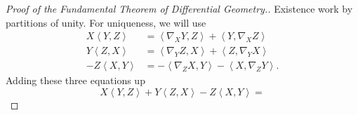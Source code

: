 \begin{proof}[Proof of the Fundamental Theorem of Differential Geometry.]
    Existence work by partitions of unity. For uniqueness, we will use
    \begin{align*}
        X \left\langle Y, Z \right\rangle &= \left\langle \nabla_X Y, Z \right\rangle + \left\langle Y, \nabla_X Z \right\rangle \\
        Y \left\langle Z, X \right\rangle &= \left\langle \nabla_Y Z, X \right\rangle + \left\langle Z, \nabla_Y X \right\rangle \\
        -Z \left\langle X, Y \right\rangle &= - \left\langle \nabla_Z X, Y \right\rangle - \left\langle X, \nabla_Z Y \right\rangle.
    \end{align*}
Adding these three equations up
\[ 
    X \left\langle Y, Z \right\rangle + Y \left\langle Z, X \right\rangle - Z \left\langle X, Y \right\rangle =

\]
\end{proof}
